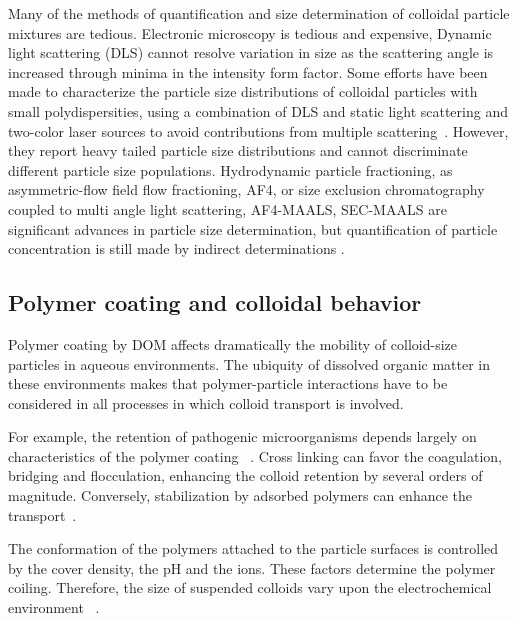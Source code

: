 \documentclass[journal=langd5,manuscript=article]{achemso}
\begin{document}
Many of the methods of quantification and size determination of colloidal particle mixtures are tedious. Electronic microscopy is tedious and expensive,
Dynamic light scattering (DLS)  cannot resolve variation in size as the scattering angle is increased through minima in the intensity form factor. Some efforts have been made to characterize the particle size distributions of colloidal particles with small polydispersities, using a combination of DLS and static light scattering and two-color laser sources to avoid contributions from multiple scattering~\cite{Bryant2003AccurateSuspensions}. However, they report heavy tailed particle size distributions and cannot discriminate different particle size populations.
Hydrodynamic particle fractioning, as asymmetric-flow field flow fractioning, AF4, or size exclusion chromatography coupled to multi angle light scattering, AF4-MAALS, SEC-MAALS are significant advances in particle size determination, but quantification of particle concentration is still made by indirect determinations \cite{imma}.



\subsection{Polymer coating and colloidal behavior}

Polymer coating by DOM affects dramatically the mobility of colloid-size particles in aqueous environments. The ubiquity of dissolved organic matter in these environments makes that polymer-particle interactions have to be considered in all processes in which colloid transport is involved.

For example, the retention of pathogenic microorganisms depends largely on characteristics of the polymer coating~\cite{Morales2011a} . Cross linking can favor the coagulation, bridging and flocculation, enhancing the colloid retention by several orders of magnitude. Conversely,  stabilization by adsorbed polymers can enhance the transport~\cite{Keller2010}.

The conformation of the polymers attached to the particle surfaces is controlled by the cover density, the pH and the ions. These factors determine the polymer coiling. Therefore, the size of suspended colloids vary upon the electrochemical environment~\cite{Morales2011a} .
\end{document}
